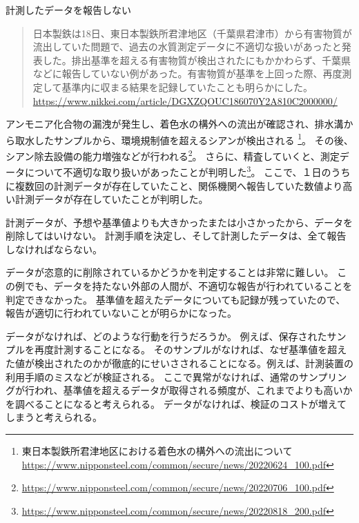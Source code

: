 \begin{SMbox}{計測したデータを報告しない}
    \begin{quote}
        日本製鉄は18日、東日本製鉄所君津地区（千葉県君津市）から有害物質が流出していた問題で、過去の水質測定データに不適切な扱いがあったと発表した。排出基準を超える有害物質が検出されたにもかかわらず、千葉県などに報告していない例があった。有害物質が基準を上回った際、再度測定して基準内に収まる結果を記録していたことも明らかにした。
        \ \ \\ \url{https://www.nikkei.com/article/DGXZQOUC186070Y2A810C2000000/}
    \end{quote}

    アンモニア化合物の漏洩が発生し、着色水の構外への流出が確認され、排水溝から取水したサンプルから、環境規制値を超えるシアンが検出される   \footnote{東日本製鉄所君津地区における着色水の構外への流出について \url{https://www.nipponsteel.com/common/secure/news/20220624_100.pdf}}。
    その後、シアン除去設備の能力増強などが行われる\footnote{\url{https://www.nipponsteel.com/common/secure/news/20220706_100.pdf}}。
    さらに、精査していくと、測定データについて不適切な取り扱いがあったことが判明した\footnote{\url{https://www.nipponsteel.com/common/secure/news/20220818_200.pdf}}。
    ここで、１日のうちに複数回の計測データが存在していたこと、関係機関へ報告していた数値より高い計測データが存在していたことが判明した。

    計測データが、予想や基準値よりも大きかったまたは小さかったから、データを削除してはいけない。
    計測手順を決定し、そして計測したデータは、全て報告しなければならない。

    データが恣意的に削除されているかどうかを判定することは非常に難しい。
    この例でも、データを持たない外部の人間が、不適切な報告が行われていることを判定できなかった。
    基準値を超えたデータについても記録が残っていたので、報告が適切に行われていないことが明らかになった。


    データがなければ、どのような行動を行うだろうか。
    例えば、保存されたサンプルを再度計測することになる。
    そのサンプルがなければ、なぜ基準値を超えた値が検出されたのかが徹底的にせいさされることになる。例えば、計測装置の利用手順のミスなどが検証される。
    ここで異常がなければ、通常のサンプリングが行われ、基準値を超えるデータが取得される頻度が、これまでよりも高いかを調べることになると考えられる。
    データがなければ、検証のコストが増えてしまうと考えられる。

    

\end{SMbox}